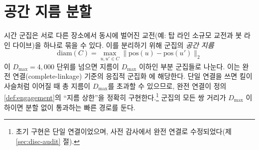 
\section{공간 지름 분할}
\label{sec:loc-spatial}

시간 군집은 서로 다른 장소에서 동시에 벌어진 교전(예: 탑 라인 소규모 교전과 봇 라인 다이브)을 하나로 묶을 수 있다. 이를 분리하기 위해 군집의 \emph{공간 지름}
\begin{equation}
  \mathrm{diam}(C) = \max_{u, u' \in C} \big\|\mathrm{pos}(u) - \mathrm{pos}(u')\big\|_2
\end{equation}
이 $D_{\max} = 4{,}000$ 단위를 넘으면 지름이 $D_{\max}$ 이하인 부분 군집들로 나눈다. 이는 완전 연결(complete-linkage) 기준의 응집적 군집화 \cite{sorensen1948method,defays1977efficient}에 해당한다. 단일 연결을 쓰면 킬이 사슬처럼 이어질 때 총 지름이 $D_{\max}$를 초과할 수 있으므로, 완전 연결이 정의 \ref{def:engagement}의 ``지름 상한''을 정확히 구현한다.\footnote{초기 구현은 단일 연결이었으며, 사전 감사에서 완전 연결로 수정되었다(제 \ref{sec:disc-audit} 절).} 군집의 모든 쌍 거리가 $D_{\max}$ 이하이면 분할 없이 통과하는 빠른 경로를 둔다.
